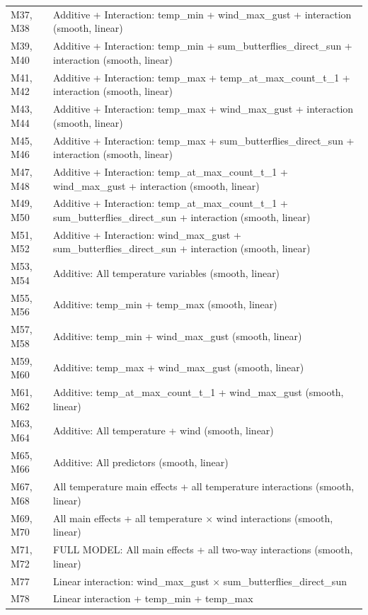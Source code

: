 \documentclass[insects,article,submit,pdftex,moreauthors]{Definitions/mdpi}
\begin{document}
\begin{appendix}
\begin{longtable}{ll}
M37, M38 & Additive + Interaction: temp\_min + wind\_max\_gust + interaction (smooth, linear) \\
M39, M40 & Additive + Interaction: temp\_min + sum\_butterflies\_direct\_sun + interaction (smooth, linear) \\
M41, M42 & Additive + Interaction: temp\_max + temp\_at\_max\_count\_t\_1 + interaction (smooth, linear) \\
M43, M44 & Additive + Interaction: temp\_max + wind\_max\_gust + interaction (smooth, linear) \\
M45, M46 & Additive + Interaction: temp\_max + sum\_butterflies\_direct\_sun + interaction (smooth, linear) \\
M47, M48 & Additive + Interaction: temp\_at\_max\_count\_t\_1 + wind\_max\_gust + interaction (smooth, linear) \\
M49, M50 & Additive + Interaction: temp\_at\_max\_count\_t\_1 + sum\_butterflies\_direct\_sun + interaction (smooth, linear) \\
M51, M52 & Additive + Interaction: wind\_max\_gust + sum\_butterflies\_direct\_sun + interaction (smooth, linear) \\
M53, M54 & Additive: All temperature variables (smooth, linear) \\
M55, M56 & Additive: temp\_min + temp\_max (smooth, linear) \\
M57, M58 & Additive: temp\_min + wind\_max\_gust (smooth, linear) \\
M59, M60 & Additive: temp\_max + wind\_max\_gust (smooth, linear) \\
M61, M62 & Additive: temp\_at\_max\_count\_t\_1 + wind\_max\_gust (smooth, linear) \\
M63, M64 & Additive: All temperature + wind (smooth, linear) \\
M65, M66 & Additive: All predictors (smooth, linear) \\
M67, M68 & All temperature main effects + all temperature interactions (smooth, linear) \\
M69, M70 & All main effects + all temperature $\times$ wind interactions (smooth, linear) \\
M71, M72 & FULL MODEL: All main effects + all two-way interactions (smooth, linear) \\
M77     & Linear interaction: wind\_max\_gust $\times$ sum\_butterflies\_direct\_sun \\
M78     & Linear interaction + temp\_min + temp\_max \\
\bottomrule
\end{longtable}


\end{appendix}
\end{document}

